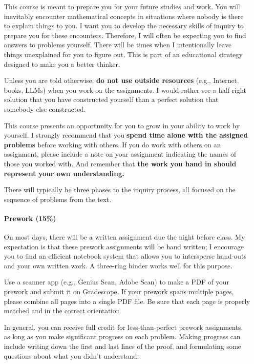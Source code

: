 \documentclass[
  twoside]{article}
\begin{document}
This course is meant to prepare you for your future studies and work.
You will inevitably encounter mathematical concepts in situations where
nobody is there to explain things to you. I want you to develop the
necessary skills of inquiry to prepare you for these encounters.
Therefore, I will often be expecting you to find answers to problems
yourself. There will be times when I intentionally leave things
unexplained for you to figure out. This is part of an educational
strategy designed to make you a better thinker.

Unless you are told otherwise, \textbf{do not use outside resources}
(e.g., Internet, books, LLMs) when you work on the assignments. I would
rather see a half-right solution that you have constructed yourself than
a perfect solution that somebody else constructed.

This course presents an opportunity for you to grow in your ability to
work by yourself. I strongly recommend that you
\textbf{spend time alone with the assigned problems} before working with
others. If you do work with others on an assignment, please include a
note on your assignment indicating the names of those you worked with.
And remember that
\textbf{the work you hand in should represent your own understanding.}

There will typically be three phases to the inquiry process, all focused
on the sequence of problems from the text.

\paragraph{Prework (15\%)}\label{prework-15}

On most days, there will be a written assignment due the night before
class. My expectation is that these prework assignments will be hand
written; I encourage you to find an efficient notebook system that
allows you to intersperse hand-outs and your own written work. A
three-ring binder works well for this purpose.

Use a scanner app (e.g., Genius Scan, Adobe Scan) to make a PDF of your
prework and submit it on Gradescope. If your prework spans multiple
pages, please combine all pages into a single PDF file. Be sure that
each page is properly matched and in the correct orientation.

In general, you can receive full credit for less-than-perfect prework
assignments, as long as you make significant progress on each problem.
Making progress can include writing down the first and last lines of the
proof, and formulating some questions about what you didn't understand.
\end{document}
